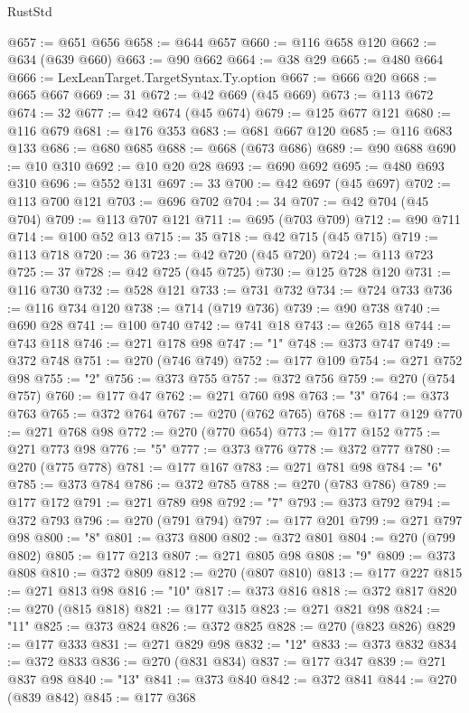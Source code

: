 \begin{lexlean}{RustStd}
\begin{coremodule}
@657 := @651 @656
@658 := @644 @657
@660 := @116 @658 @120
@662 := @634 (@639 @660)
@663 := @90 @662
@664 := @38 @29
@665 := @480 @664
@666 := LexLeanTarget.TargetSyntax.Ty.option
@667 := @666 @20
@668 := @665 @667
@669 := 31
@672 := @42 @669 (@45 @669)
@673 := @113 @672
@674 := 32
@677 := @42 @674 (@45 @674)
@679 := @125 @677 @121
@680 := @116 @679
@681 := @176 @353
@683 := @681 @667 @120
@685 := @116 @683 @133
@686 := @680 @685
@688 := @668 (@673 @686)
@689 := @90 @688
@690 := @10 @310
@692 := @10 @20 @28
@693 := @690 @692
@695 := @480 @693 @310
@696 := @552 @131
@697 := 33
@700 := @42 @697 (@45 @697)
@702 := @113 @700 @121
@703 := @696 @702
@704 := 34
@707 := @42 @704 (@45 @704)
@709 := @113 @707 @121
@711 := @695 (@703 @709)
@712 := @90 @711
@714 := @100 @52 @13
@715 := 35
@718 := @42 @715 (@45 @715)
@719 := @113 @718
@720 := 36
@723 := @42 @720 (@45 @720)
@724 := @113 @723
@725 := 37
@728 := @42 @725 (@45 @725)
@730 := @125 @728 @120
@731 := @116 @730
@732 := @528 @121
@733 := @731 @732
@734 := @724 @733
@736 := @116 @734 @120
@738 := @714 (@719 @736)
@739 := @90 @738
@740 := @690 @28
@741 := @100 @740
@742 := @741 @18
@743 := @265 @18
@744 := @743 @118
@746 := @271 @178 @98
@747 := "1"
@748 := @373 @747
@749 := @372 @748
@751 := @270 (@746 @749)
@752 := @177 @109
@754 := @271 @752 @98
@755 := "2"
@756 := @373 @755
@757 := @372 @756
@759 := @270 (@754 @757)
@760 := @177 @47
@762 := @271 @760 @98
@763 := "3"
@764 := @373 @763
@765 := @372 @764
@767 := @270 (@762 @765)
@768 := @177 @129
@770 := @271 @768 @98
@772 := @270 (@770 @654)
@773 := @177 @152
@775 := @271 @773 @98
@776 := "5"
@777 := @373 @776
@778 := @372 @777
@780 := @270 (@775 @778)
@781 := @177 @167
@783 := @271 @781 @98
@784 := "6"
@785 := @373 @784
@786 := @372 @785
@788 := @270 (@783 @786)
@789 := @177 @172
@791 := @271 @789 @98
@792 := "7"
@793 := @373 @792
@794 := @372 @793
@796 := @270 (@791 @794)
@797 := @177 @201
@799 := @271 @797 @98
@800 := "8"
@801 := @373 @800
@802 := @372 @801
@804 := @270 (@799 @802)
@805 := @177 @213
@807 := @271 @805 @98
@808 := "9"
@809 := @373 @808
@810 := @372 @809
@812 := @270 (@807 @810)
@813 := @177 @227
@815 := @271 @813 @98
@816 := "10"
@817 := @373 @816
@818 := @372 @817
@820 := @270 (@815 @818)
@821 := @177 @315
@823 := @271 @821 @98
@824 := "11"
@825 := @373 @824
@826 := @372 @825
@828 := @270 (@823 @826)
@829 := @177 @333
@831 := @271 @829 @98
@832 := "12"
@833 := @373 @832
@834 := @372 @833
@836 := @270 (@831 @834)
@837 := @177 @347
@839 := @271 @837 @98
@840 := "13"
@841 := @373 @840
@842 := @372 @841
@844 := @270 (@839 @842)
@845 := @177 @368

\end{coremodule}
\end{lexlean}
